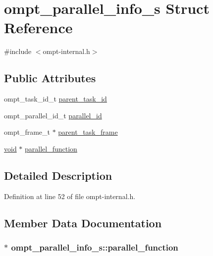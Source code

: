 \hypertarget{structompt__parallel__info__s}{\section{ompt\-\_\-parallel\-\_\-info\-\_\-s Struct Reference}
\label{structompt__parallel__info__s}
}


{\ttfamily \#include $<$ompt-\/internal.\-h$>$}

\subsection*{Public Attributes}
\begin{DoxyCompactItemize}
\item 
ompt\-\_\-task\-\_\-id\-\_\-t \hyperlink{structompt__parallel__info__s_a5aecacfb100ffc512bc03698eb14023a}{parent\-\_\-task\-\_\-id}
\item 
ompt\-\_\-parallel\-\_\-id\-\_\-t \hyperlink{structompt__parallel__info__s_ae6048ad408a97960d4bff5630e4cf9df}{parallel\-\_\-id}
\item 
ompt\-\_\-frame\-\_\-t $\ast$ \hyperlink{structompt__parallel__info__s_a2801b33cdc3811de76067d83e8d987cc}{parent\-\_\-task\-\_\-frame}
\item 
\hyperlink{ittnotify__static_8h_af941d56e55e3c5465135b60c4d6343ed}{void} $\ast$ \hyperlink{structompt__parallel__info__s_a8771c26e785718fb9b2f3e96a2d15123}{parallel\-\_\-function}
\end{DoxyCompactItemize}


\subsection{Detailed Description}


Definition at line 52 of file ompt-\/internal.\-h.



\subsection{Member Data Documentation}
\hypertarget{structompt__parallel__info__s_a8771c26e785718fb9b2f3e96a2d15123}{
\subsubsection[{parallel\-\_\-function}]{$\ast$ ompt\-\_\-parallel\-\_\-info\-\_\-s\-::parallel\-\_\-function}}\label{structompt__parallel__info__s_a8771c26e785718fb9b2f3e96a2d15123}


